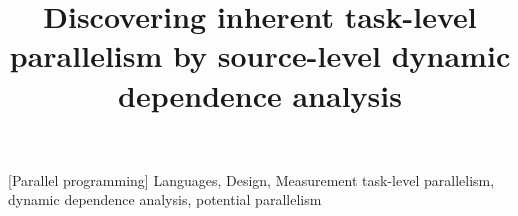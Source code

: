 \documentclass[preprint,natbib]{sigplanconf}
\begin{document}
\title{Discovering inherent task-level parallelism by source-level dynamic dependence analysis}

          
\maketitle 



[Parallel programming]
\terms
Languages, Design, Measurement
\keywords
task-level parallelism, dynamic dependence analysis, potential parallelism









{}
\end{document}
